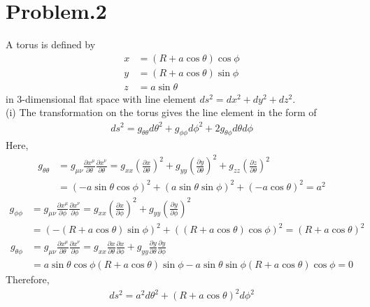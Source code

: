 \documentclass[12pt]{article}
\begin{document}
\section*{Problem.2}
A torus is defined by
\begin{align}
x &= \left( R + a \cos{\theta}\right) \cos{\phi}\\
y &= \left( R + a \cos{\theta}\right) \sin{\phi}\\
z &= a \sin{\theta}
\end{align}
in 3-dimensional flat space with line element $ds^2 = dx^2 + dy^2 + dz^2$.\\
(i) The transformation on the torus gives the line element in the form of
\begin{align}
ds^2 = g_{\theta \theta} d\theta^2 + g_{\phi \phi} d\phi^2 + 2 g_{\theta \phi} d\theta d\phi
\end{align}
Here,
\begin{align}
g_{\theta \theta} &= g_{\mu \nu} \frac{\partial x^{\mu}}{\partial \theta} \frac{\partial x^{\nu}}{\partial \theta} = g_{x x} \left(\frac{\partial x}{\partial \theta}\right)^2 + g_{y y} \left(\frac{\partial y}{\partial \theta}\right)^2 + g_{z z} \left(\frac{\partial z}{\partial \theta}\right)^2\nonumber \\
&= \left(- a \sin{\theta} \cos{\phi} \right)^2 + \left(a \sin{\theta} \sin{\phi} \right)^2 + \left(- a \cos{\theta}\right)^2 = a^2
\end{align}
\begin{align}
g_{\phi \phi} &= g_{\mu \nu} \frac{\partial x^{\mu}}{\partial \phi} \frac{\partial x^{\nu}}{\partial \phi} = g_{x x} \left(\frac{\partial x}{\partial \phi}\right)^2 + g_{y y} \left(\frac{\partial y}{\partial \phi}\right)^2\\
&= \left(- \left( R + a \cos{\theta}\right) \sin{\phi} \right)^2 + \left(\left( R + a \cos{\theta}\right) \cos{\phi} \right)^2 = \left( R + a \cos{\theta}\right)^2
\end{align}
\begin{align}
g_{\theta \phi} &= g_{\mu \nu} \frac{\partial x^{\mu}}{\partial \theta} \frac{\partial x^{\nu}}{\partial \phi} = g_{x x} \frac{\partial x}{\partial \theta} \frac{\partial x}{\partial \phi} + g_{y y} \frac{\partial y}{\partial \theta} \frac{\partial y}{\partial \phi}\\
&= a \sin{\theta}\cos{\phi} \left( R + a \cos{\theta}\right)\sin{\phi} - a \sin{\theta}\sin{\phi} \left( R + a \cos{\theta}\right)\cos{\phi} = 0
\end{align}
Therefore,
\begin{align}
ds^2 = a^2 d\theta^2 + \left( R + a \cos{\theta}\right)^2 d\phi^2
\end{align}
\end{document}
